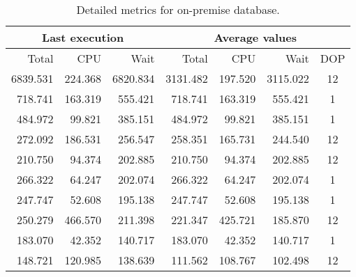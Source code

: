 \begin{table}[p]
    \centering
    \begin{tabular}{|r r r|r r r|c|}
        \toprule
        \multicolumn{3}{|c|}{Last execution} & \multicolumn{4}{c|}{Average values} \\
        \midrule
        Total       & CPU     & Wait         & Total    & CPU     & Wait     & DOP  \\
        \midrule
        6839.531    & 224.368 & 6820.834     & 3131.482 & 197.520 & 3115.022 & 12   \\
         718.741    & 163.319 &  555.421     &  718.741 & 163.319 &  555.421 &  1   \\
         484.972    &  99.821 &  385.151     &  484.972 &  99.821 &  385.151 &  1   \\
         272.092    & 186.531 &  256.547     &  258.351 & 165.731 &  244.540 & 12   \\
         210.750    &  94.374 &  202.885     &  210.750 &  94.374 &  202.885 & 12   \\
         266.322    &  64.247 &  202.074     &  266.322 &  64.247 &  202.074 &  1   \\
         247.747    &  52.608 &  195.138     &  247.747 &  52.608 &  195.138 &  1   \\
         250.279    & 466.570 &  211.398     &  221.347 & 425.721 &  185.870 & 12   \\
         183.070    &  42.352 &  140.717     &  183.070 &  42.352 &  140.717 &  1   \\
         148.721    & 120.985 &  138.639     &  111.562 & 108.767 &  102.498 & 12   \\
 \bottomrule
    \end{tabular}
    \caption{Detailed metrics for on-premise database.}
    \label{tab:tests:perf:metrics:detailed:aa}
\end{table}

